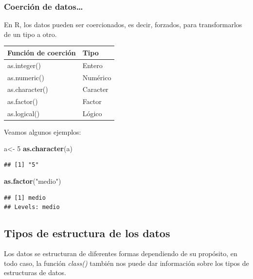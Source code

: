 \documentclass[
]{book}
\newenvironment{Shaded}{\begin{snugshade}}{\end{snugshade}}
\newcommand{\DecValTok}[1]{\textcolor[rgb]{0.00,0.00,0.81}{#1}}
\newcommand{\FunctionTok}[1]{\textcolor[rgb]{0.13,0.29,0.53}{\textbf{#1}}}
\newcommand{\NormalTok}[1]{#1}
\newcommand{\OtherTok}[1]{\textcolor[rgb]{0.56,0.35,0.01}{#1}}
\newcommand{\StringTok}[1]{\textcolor[rgb]{0.31,0.60,0.02}{#1}}
\begin{document}
\subsubsection{Coerción de datos\ldots{}}\label{coerciuxf3n-de-datos}

En R, los datos pueden ser coercionados, es decir, forzados, para transformarlos de un tipo a otro.

\begin{longtable}[]{@{}ll@{}}
\toprule\noalign{}
Función de coerción & Tipo \\
\midrule\noalign{}
\endhead
\bottomrule\noalign{}
\endlastfoot
as.integer() & Entero \\
as.numeric() & Numérico \\
as.character() & Caracter \\
as.factor() & Factor \\
as.logical() & Lógico \\
\end{longtable}

Veamos algunos ejemplos:

\begin{Shaded}
\begin{Highlighting}[]
\NormalTok{a}\OtherTok{\textless{}{-}} \DecValTok{5}
\FunctionTok{as.character}\NormalTok{(a)}
\end{Highlighting}
\end{Shaded}

\begin{verbatim}
## [1] "5"
\end{verbatim}

\begin{Shaded}
\begin{Highlighting}[]
\FunctionTok{as.factor}\NormalTok{(}\StringTok{"medio"}\NormalTok{)}
\end{Highlighting}
\end{Shaded}

\begin{verbatim}
## [1] medio
## Levels: medio
\end{verbatim}

\subsection{Tipos de estructura de los datos}\label{tipos-de-estructura-de-los-datos}

Los datos se estructuran de diferentes formas dependiendo de su propósito, en todo caso, la función \emph{class()} también nos puede dar información sobre los tipos de estructuras de datos.
\end{document}
